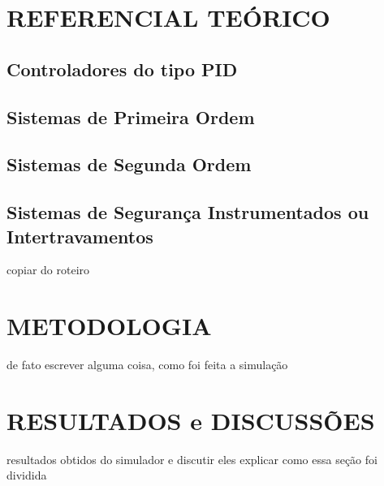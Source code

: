 \documentclass[a4paper,12pt]{article}
\begin{document}
\newpage


\thispagestyle{main}

\section{REFERENCIAL TEÓRICO}

\subsection{Controladores do tipo PID}\hspace{4ex}

\subsection{Sistemas de Primeira Ordem}\hspace{4ex}

\subsection{Sistemas de Segunda Ordem}\hspace{4ex}


\subsection{Sistemas de Segurança Instrumentados ou Intertravamentos}\hspace{4ex}

\newpage


copiar do roteiro


\thispagestyle{main}

\section{METODOLOGIA}\hspace{4ex}
de fato escrever alguma coisa, como foi feita a simulação
\newpage


\thispagestyle{main}

\section{RESULTADOS e DISCUSSÕES}\hspace{4ex}
resultados obtidos do simulador e discutir eles
explicar como essa seção foi dividida
\end{document}
